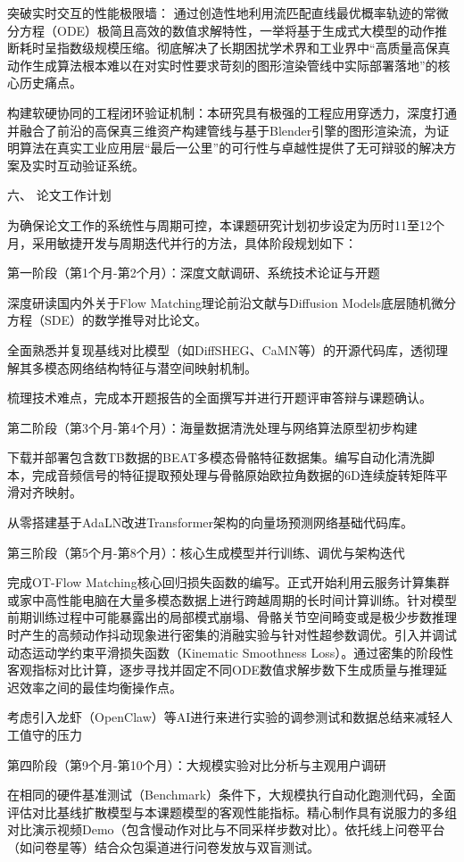 \documentclass[UTF8]{ctexart}
\begin{document}
突破实时交互的性能极限墙：
通过创造性地利用流匹配直线最优概率轨迹的常微分方程（ODE）极简且高效的数值求解特性，一举将基于生成式大模型的动作推断耗时呈指数级规模压缩。彻底解决了长期困扰学术界和工业界中``高质量高保真动作生成算法根本难以在对实时性要求苛刻的图形渲染管线中实际部署落地''的核心历史痛点。

构建软硬协同的工程闭环验证机制：本研究具有极强的工程应用穿透力，深度打通并融合了前沿的高保真三维资产构建管线与基于Blender引擎的图形渲染流，为证明算法在真实工业应用层``最后一公里''的可行性与卓越性提供了无可辩驳的解决方案及实时互动验证系统。

六、 论文工作计划

为确保论文工作的系统性与周期可控，本课题研究计划初步设定为历时11至12个月，采用敏捷开发与周期迭代并行的方法，具体阶段规划如下：

第一阶段（第1个月-第2个月）：深度文献调研、系统技术论证与开题

深度研读国内外关于Flow Matching理论前沿文献与Diffusion
Models底层随机微分方程（SDE）的数学推导对比论文。

全面熟悉并复现基线对比模型（如DiffSHEG、CaMN等）的开源代码库，透彻理解其多模态网络结构特征与潜空间映射机制。

梳理技术难点，完成本开题报告的全面撰写并进行开题评审答辩与课题确认。

第二阶段（第3个月-第4个月）：海量数据清洗处理与网络算法原型初步构建

下载并部署包含数TB数据的BEAT多模态骨骼特征数据集。编写自动化清洗脚本，完成音频信号的特征提取预处理与骨骼原始欧拉角数据的6D连续旋转矩阵平滑对齐映射。

从零搭建基于AdaLN改进Transformer架构的向量场预测网络基础代码库。

第三阶段（第5个月-第8个月）：核心生成模型并行训练、调优与架构迭代

完成OT-Flow
Matching核心回归损失函数的编写。正式开始利用云服务计算集群或家中高性能电脑在大量多模态数据上进行跨越周期的长时间计算训练。针对模型前期训练过程中可能暴露出的局部模式崩塌、骨骼关节空间畸变或是极少步数推理时产生的高频动作抖动现象进行密集的消融实验与针对性超参数调优。引入并调试动态运动学约束平滑损失函数（Kinematic
Smoothness
Loss）。通过密集的阶段性客观指标对比计算，逐步寻找并固定不同ODE数值求解步数下生成质量与推理延迟效率之间的最佳均衡操作点。

考虑引入龙虾（OpenClaw）等AI进行来进行实验的调参测试和数据总结来减轻人工值守的压力

第四阶段（第9个月-第10个月）：大规模实验对比分析与主观用户调研

在相同的硬件基准测试（Benchmark）条件下，大规模执行自动化跑测代码，全面评估对比基线扩散模型与本课题模型的客观性能指标。精心制作具有说服力的多组对比演示视频Demo（包含慢动作对比与不同采样步数对比）。依托线上问卷平台（如问卷星等）结合众包渠道进行问卷发放与双盲测试。
\end{document}
